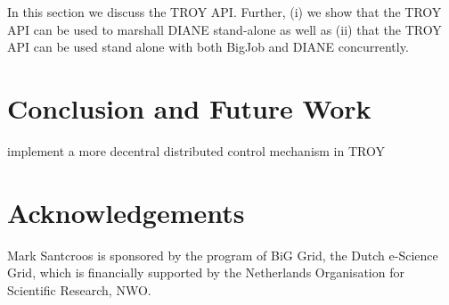 \documentclass[conference,final]{IEEEtran}
\begin{document}
In this section we discuss the TROY API. Further, (i) we show that the TROY API 
can be used to  marshall DIANE stand-alone as well as (ii) that the TROY API 
can be used stand alone with both BigJob and DIANE concurrently.

\section{Conclusion and Future Work}


implement a more decentral distributed control mechanism in TROY

\section*{Acknowledgements}
Mark Santcroos is sponsored by the program of BiG Grid, the Dutch e-Science Grid, which is financially supported by the Netherlands Organisation for Scientific Research, NWO.




\end{document}
